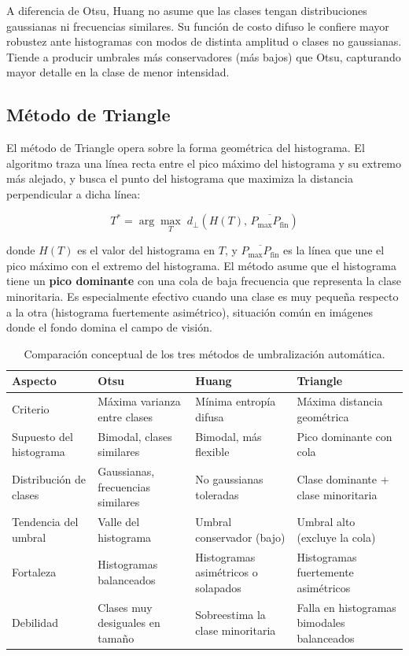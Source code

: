 \documentclass[12pt, a4paper]{article}
\begin{document}
A diferencia de Otsu, Huang no asume que las clases tengan distribuciones gaussianas ni
frecuencias similares. Su función de costo difuso le confiere mayor robustez ante
histogramas con modos de distinta amplitud o clases no gaussianas. Tiende a producir
umbrales más conservadores (más bajos) que Otsu, capturando mayor detalle en la clase
de menor intensidad.

\subsection{Método de Triangle}

El método de Triangle \cite{zack1977} opera sobre la forma geométrica del histograma.
El algoritmo traza una línea recta entre el pico máximo del histograma y su extremo más
alejado, y busca el punto del histograma que maximiza la distancia perpendicular a dicha
línea:

\begin{equation}
  T^* = \arg\max_{T}\; d_\perp\!\left(H(T),\, \overline{P_{\max}P_{\text{fin}}}\right)
  \label{eq:triangle}
\end{equation}

donde $H(T)$ es el valor del histograma en $T$, y $\overline{P_{\max}P_{\text{fin}}}$ es
la línea que une el pico máximo con el extremo del histograma. El método asume que el
histograma tiene un \textbf{pico dominante} con una cola de baja frecuencia que representa
la clase minoritaria. Es especialmente efectivo cuando una clase es muy pequeña respecto
a la otra (histograma fuertemente asimétrico), situación común en imágenes donde el fondo
domina el campo de visión.

\begin{table}[H]
\centering
\renewcommand{\arraystretch}{1.5}
\begin{tabularx}{\textwidth}{lXXX}
\toprule
\textbf{Aspecto} & \textbf{Otsu} & \textbf{Huang} & \textbf{Triangle} \\
\midrule
Criterio &
  Máxima varianza entre clases &
  Mínima entropía difusa &
  Máxima distancia geométrica \\
Supuesto del histograma &
  Bimodal, clases similares &
  Bimodal, más flexible &
  Pico dominante con cola \\
Distribución de clases &
  Gaussianas, frecuencias similares &
  No gaussianas toleradas &
  Clase dominante + clase minoritaria \\
Tendencia del umbral &
  Valle del histograma &
  Umbral conservador (bajo) &
  Umbral alto (excluye la cola) \\
Fortaleza &
  Histogramas balanceados &
  Histogramas asimétricos o solapados &
  Histogramas fuertemente asimétricos \\
Debilidad &
  Clases muy desiguales en tamaño &
  Sobreestima la clase minoritaria &
  Falla en histogramas bimodales balanceados \\
\bottomrule
\end{tabularx}
\caption{Comparación conceptual de los tres métodos de umbralización automática.}
\label{tab:metodos}
\end{table}
\end{document}
